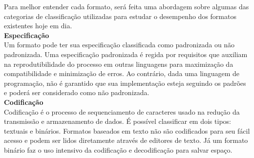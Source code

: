 \begin{table}[ht!]
  \centering
  \caption{Comparação de formatos de serialização}
\end{table}

Para melhor entender cada formato, será feita uma abordagem sobre algumas das categorias de classificação utilizadas para estudar o desempenho dos formatos existentes hoje em dia. \\

\textbf{Especificação} \\

Um formato pode ter sua especificação classificada como padronizada ou não padronizada. Uma especificação padronizada é regida por requisitos que auxiliam na reprodutibilidade do processo em outras linguagens para maximização da compatibilidade e minimização de erros. Ao contrário, dada uma linguagem de programação, não é garantido que sua implementação esteja seguindo os padrões e poderá ser considerado como não padronizada. \cite{McDermid1991} \\

\textbf{Codificação} \\

Codificação é o processo de sequenciamento de caracteres usado na redução da transmissão e armazenamento de dados. É possível classificar em dois tipos: textuais e binários. Formatos baseados em texto não são codificados para seu fácil acesso e podem ser lidos diretamente através de editores de texto. Já um formato binário faz o uso intensivo da codificação e decodificação para salvar espaço. \cite{Queiros2014} \\

